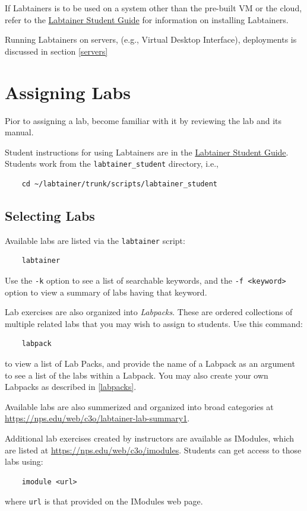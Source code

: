 \documentclass[12pt]{article}
\begin{document}
If Labtainers is to be used on a system other than the pre-built VM or the cloud,
refer to the \underline{Labtainer Student Guide} for information on
installing Labtainers.

Running Labtainers on servers, (e.g., Virtual Desktop Interface), deployments is discussed in
section \ref{servers}

\section{Assigning Labs}
Pior to assigning a lab, become familiar with it by reviewing the lab and its manual.

Student instructions for using Labtainers are in the \underline{Labtainer Student Guide}.  
Students work from the {\tt labtainer_student} directory, i.e.,
\begin{verbatim}
    cd ~/labtainer/trunk/scripts/labtainer_student
\end{verbatim}
\subsection{Selecting Labs}
Available labs are listed via the {\tt labtainer} script:
\begin{verbatim}
    labtainer
\end{verbatim}
\noindent Use the {\tt -k} option to see a list of searchable keywords, and the {\tt -f <keyword>} option to view a summary
of labs having that keyword.

Lab exercises are also organized into \textit{Labpacks}. These are ordered collections of multiple related labs that you may
wish to assign to students.  Use this command:
\begin{verbatim}
    labpack
\end{verbatim}
\noindent to view a list of Lab Packs, and provide the name of a Labpack as an argument to see a list of the labs
within a Labpack.  You may also create your own Labpacks as described in \ref{labpacks}. 

Available labs are also summerized and organized into broad categories at \url{https://nps.edu/web/c3o/labtainer-lab-summary1}.

Additional lab exercises created by instructors are available as IModules, which are listed at \url{https://nps.edu/web/c3o/imodules}.
Students can get access to those labs using:
\begin{verbatim}
    imodule <url>
\end{verbatim}
\noindent where {\tt url} is that provided on the IModules web page.
\end{document}
